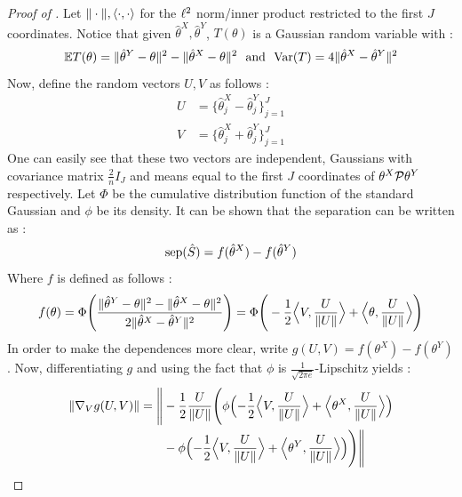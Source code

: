 \begin{proof}[Proof of ]
    Let $\norm{\cdot}, \scal{\cdot}{\cdot}$ for the $\l^2$ norm/inner product restricted to the first $J$ coordinates. Notice that given $\hat{\theta}^X,\hat{\theta}^Y$, $T(\theta)$ is a Gaussian random variable with : 
    \begin{equation*}
        \E T(\theta) = \normp[2]{\hat{\theta}^Y - \theta} - \normp[2]{\hat{\theta}^X-\theta}  \ \text{ and } \ \var{T} = 4 \normp[2]{\hat{\theta}^X-\hat{\theta}^Y}
    \end{equation*}
    Now, define the random vectors $U,V$ as follows : 
    \begin{align*}
        U &= \bigl\{ \hat{\theta}^X_j - \hat{\theta}^Y_j\bigr\}_{j=1}^J \\
        V &= \bigl\{\hat{\theta}^X_j + \hat{\theta}^Y_j\bigr\}_{j=1}^J
    \end{align*}
    One can easily see that these two vectors are independent, Gaussians with covariance matrix $\frac{2}{n}I_J$ and means equal to the first $J$ coordinates of $\theta^X \minusplus \theta^Y$ respectively. Let $\Phi$ be the cumulative distribution function of the standard Gaussian and $\phi$ be its density.
    It can be shown that the separation can be written as : \begin{equation*}
        \sep(\hat{S}) = f(\hat{\theta}^X)- f(\hat{\theta}^Y)
    \end{equation*}
    Where $f$ is defined as follows : 
    \begin{equation*}
        f(\theta) = \Phi\Bigg( \frac{\normp[2]{\hat{\theta}^Y -\theta}-\normp[2]{\hat{\theta}^X -\theta}}{2\normp[2]{\hat{\theta}^X -\hat{\theta}^Y}} \Bigg) = \Phi\Bigg(-\frac{1}{2}\bigscal{V}{\frac{U}{\norm{U}}} + \bigscal{\theta}{\frac{U}{\norm{U}}}\Bigg)
    \end{equation*}
    In order to make the dependences more clear, write $g(U,V) = f(\theta^X)-f(\theta^Y)$. Now, differentiating $g$ and using the fact that $\phi$ is $\frac{1}{\sqrt{2\pi e}}$-Lipschitz yields : 
    \begin{align*}
        \norm{\nabla_V g(U,V)}  &= \begin{aligned}[t]
            \bignorm{&-\frac{1}{2}\frac{U}{\norm{U}}\Bigg(\phi\Bigl( -\frac{1}{2}\bigscal{V}{\frac{U}{\norm{U}}} + \bigscal{\theta^X}{\frac{U}{\norm{U}}} \Bigr)\\
            &- \phi\Bigl(-\frac{1}{2}\bigscal{V}{\frac{U}{\norm{U}}} + \bigscal{\theta^Y}{\frac{U}{\norm{U}}} \Bigr) \Bigg)}
        \end{aligned}\\

\end{align*}
\end{proof}
